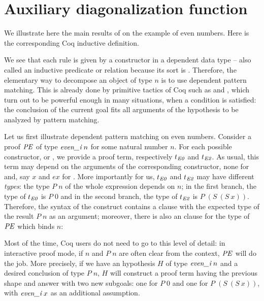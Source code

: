 \section{Auxiliary diagonalization function}
\label{sec:absurd}

We illustrate here the main results of \cite{small_inv}
on the example of even numbers.
Here is the corresponding Coq inductive definition.

\medskip
{}
\medskip

\noindent
We see that each rule is given by a constructor in a dependent data type
-- also called an inductive predicate or relation because its sort is \Prop.
Therefore, the elementary way to decompose an object of type \eveni $n$
is to use dependent pattern matching.
This is already done by primitive tactics of Coq
such as  and ,
which turn out to be powerful enough in many situations, 
when a condition is satisfied:
the conclusion of the current goal fits all arguments of 
the hypothesis to be analyzed by pattern matching.

Let us first illustrate 
dependent pattern matching on even numbers.
Consider a proof $\mathit{PE}$ of type $\textit{even\_i}\;n$
for some natural number $n$.
For each possible constructor, \EZ or \ET, 
we provide a proof term,
respectively $t_{\textit{E0}}$ and $t_{\textit{E2}}$.
As usual, this term may depend on the arguments 
of the corresponding constructor,
none for \EZ and, say $x$ and $ex$ for \ET.
More importantly for us, $t_{\textit{E0}}$ and $t_{\textit{E2}}$ may have
different \emph{types}:
the type $P\;n$ of the whole expression depends on $n$;
in the first branch, the type of $t_{\textit{E0}}$ is $P\;0$ and
in the second branch, the type of $t_{\textit{E2}}$ is $P\; (S\: (S\:x))$.
Therefore, the syntax of the  construct
contains a  clause with the expected type
of the result $P\;n$ as an argument;
moreover, 
there is also an  clause for the type of $\mathit{PE}$
which binds $n$:

\medskip

\noindent
Most of the time, Coq users do not need to go to this
level of detail: 
in interactive proof mode, 
if $n$ and $P\;n$ are often clear from the context,
\casetac $\mathit{PE}$ will do the job.
More precisely, if we have an hypothesis $H$ of type $\textit{even\_i}\;n$
and a desired conclusion of type $P\;n$, 
\casetac $H$ will construct a proof term having the previous
shape and answer with two new subgoals:
one for $P\;0$ and one for $P\; (S\: (S\:x))$,
with $\textit{even\_i}\;x$ as an additional assumption.

